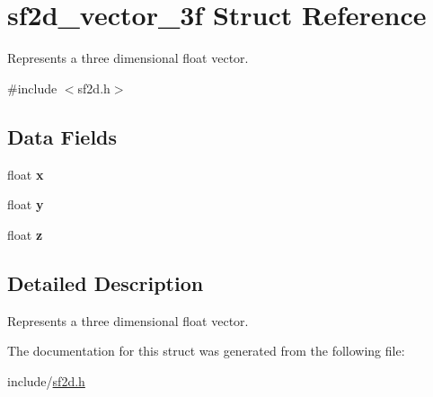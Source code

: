 \hypertarget{structsf2d__vector__3f}{\section{sf2d\-\_\-vector\-\_\-3f Struct Reference}
\label{structsf2d__vector__3f}
}


Represents a three dimensional float vector.  




{\ttfamily \#include $<$sf2d.\-h$>$}

\subsection*{Data Fields}
\begin{DoxyCompactItemize}
\item 
\hypertarget{structsf2d__vector__3f_acfe35bcf39de79f3edd634ad1bce3d74}{float {\bfseries x}}\label{structsf2d__vector__3f_acfe35bcf39de79f3edd634ad1bce3d74}

\item 
\hypertarget{structsf2d__vector__3f_ac7f2e5651290011f9c1fbe017dec219e}{float {\bfseries y}}\label{structsf2d__vector__3f_ac7f2e5651290011f9c1fbe017dec219e}

\item 
\hypertarget{structsf2d__vector__3f_ab8ae4e1b464f00ac0d6dc3714f94ac18}{float {\bfseries z}}\label{structsf2d__vector__3f_ab8ae4e1b464f00ac0d6dc3714f94ac18}

\end{DoxyCompactItemize}


\subsection{Detailed Description}
Represents a three dimensional float vector. 

The documentation for this struct was generated from the following file\-:\begin{DoxyCompactItemize}
\item 
include/\hyperlink{sf2d_8h}{sf2d.\-h}\end{DoxyCompactItemize}
